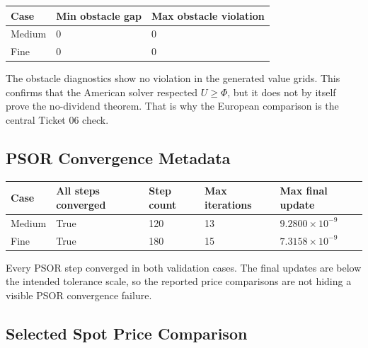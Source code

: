 \documentclass[11pt,a4paper]{article}
\begin{document}
\begin{longtable}{@{}L{0.16\textwidth}L{0.18\textwidth}L{0.22\textwidth}@{}}
\toprule
Case & Min obstacle gap & Max obstacle violation \\
\midrule
\endhead
Medium & 0 & 0 \\
Fine & 0 & 0 \\
\bottomrule
\end{longtable}

The obstacle diagnostics show no violation in the generated value grids. This confirms that the
American solver respected \(U\geq\Phi\), but it does not by itself prove the no-dividend theorem.
That is why the European comparison is the central Ticket 06 check.

\subsection{PSOR Convergence Metadata}

\begin{longtable}{@{}L{0.14\textwidth}L{0.18\textwidth}L{0.15\textwidth}L{0.18\textwidth}L{0.22\textwidth}@{}}
\toprule
Case & All steps converged & Step count & Max iterations & Max final update \\
\midrule
\endhead
Medium & True & 120 & 13 & \(9.2800\times10^{-9}\) \\
Fine & True & 180 & 15 & \(7.3158\times10^{-9}\) \\
\bottomrule
\end{longtable}

Every PSOR step converged in both validation cases. The final updates are below the intended
tolerance scale, so the reported price comparisons are not hiding a visible PSOR convergence
failure.

\subsection{Selected Spot Price Comparison}
\end{document}

